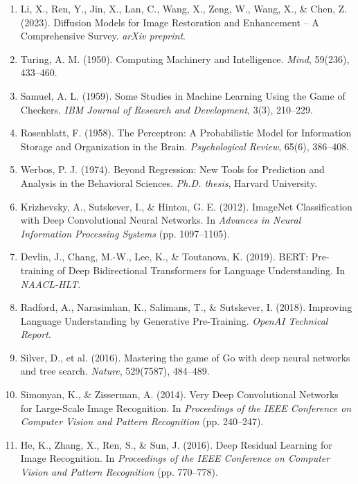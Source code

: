 \documentclass[12pt]{report}
\begin{document}
\begin{enumerate}
    \item Li, X., Ren, Y., Jin, X., Lan, C., Wang, X., Zeng, W., Wang, X., \& Chen, Z. (2023). Diffusion Models for Image Restoration and Enhancement – A Comprehensive Survey. \textit{arXiv preprint}.
    
    \item Turing, A. M. (1950). Computing Machinery and Intelligence. \textit{Mind}, 59(236), 433–460.
    
    \item Samuel, A. L. (1959). Some Studies in Machine Learning Using the Game of Checkers. \textit{IBM Journal of Research and Development}, 3(3), 210–229.
    
    \item Rosenblatt, F. (1958). The Perceptron: A Probabilistic Model for Information Storage and Organization in the Brain. \textit{Psychological Review}, 65(6), 386–408.
    
    \item Werbos, P. J. (1974). Beyond Regression: New Tools for Prediction and Analysis in the Behavioral Sciences. \textit{Ph.D. thesis}, Harvard University.
    
    \item Krizhevsky, A., Sutskever, I., \& Hinton, G. E. (2012). ImageNet Classification with Deep Convolutional Neural Networks. In \textit{Advances in Neural Information Processing Systems} (pp. 1097–1105).
    
    \item Devlin, J., Chang, M.-W., Lee, K., \& Toutanova, K. (2019). BERT: Pre-training of Deep Bidirectional Transformers for Language Understanding. In \textit{NAACL-HLT}.
    
    \item Radford, A., Narasimhan, K., Salimans, T., \& Sutskever, I. (2018). Improving Language Understanding by Generative Pre-Training. \textit{OpenAI Technical Report}.
    
    \item Silver, D., et al. (2016). Mastering the game of Go with deep neural networks and tree search. \textit{Nature}, 529(7587), 484–489.
    
    \item Simonyan, K., \& Zisserman, A. (2014). Very Deep Convolutional Networks for Large-Scale Image Recognition. In \textit{Proceedings of the IEEE Conference on Computer Vision and Pattern Recognition} (pp. 240–247).
    
    \item He, K., Zhang, X., Ren, S., \& Sun, J. (2016). Deep Residual Learning for Image Recognition. In \textit{Proceedings of the IEEE Conference on Computer Vision and Pattern Recognition} (pp. 770–778).
    

\end{enumerate}
\end{document}
